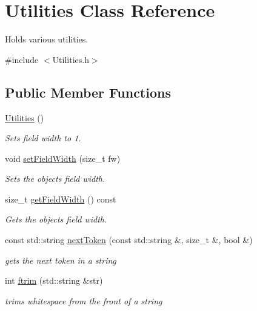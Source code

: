 \hypertarget{class_utilities}{}\section{Utilities Class Reference}
\label{class_utilities}


Holds various utilities.  




{\ttfamily \#include $<$Utilities.\+h$>$}

\subsection*{Public Member Functions}
\begin{DoxyCompactItemize}
\item 
\mbox{\hyperlink{class_utilities_ab1676c9ce35cf347a73d16f1094e1271}{Utilities}} ()
\begin{DoxyCompactList}\small\item\em Sets field width to 1. \end{DoxyCompactList}\item 
void \mbox{\hyperlink{class_utilities_a90cee9218e3faff9bd060beda0e83e17}{set\+Field\+Width}} (size\+\_\+t fw)
\begin{DoxyCompactList}\small\item\em Sets the objects field width. \end{DoxyCompactList}\item 
size\+\_\+t \mbox{\hyperlink{class_utilities_a94abc3ceade71097979e76e15008efba}{get\+Field\+Width}} () const
\begin{DoxyCompactList}\small\item\em Gets the objects field width. \end{DoxyCompactList}\item 
const std\+::string \mbox{\hyperlink{class_utilities_a59c27deae1e3810d8591b35ed90b7f33}{next\+Token}} (const std\+::string \&, size\+\_\+t \&, bool \&)
\begin{DoxyCompactList}\small\item\em gets the next token in a string \end{DoxyCompactList}\item 
int \mbox{\hyperlink{class_utilities_a8f3e9e16a823944a3bdb67c6c3d70d08}{ftrim}} (std\+::string \&str)
\begin{DoxyCompactList}\small\item\em trims whitespace from the front of a string \end{DoxyCompactList}\item 

\end{DoxyCompactItemize}
